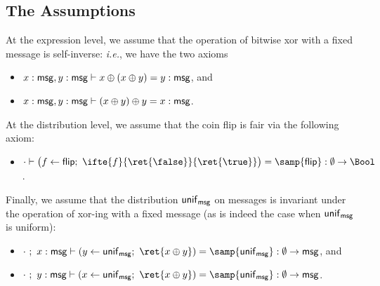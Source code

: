 \subsection{The Assumptions}
At the expression level, we assume that the operation of bitwise xor with a fixed message is self-inverse: \emph{i.e.}, we have the two axioms
\begin{itemize}
\item $x : \mathsf{msg}, y : \mathsf{msg} \vdash x \oplus (x \oplus y) = y : \mathsf{msg}$, and
\item $x : \mathsf{msg}, y : \mathsf{msg} \vdash (x \oplus y) \oplus y = x : \mathsf{msg}$.
\end{itemize}
At the distribution level, we assume that the coin flip is fair via the following axiom:
\begin{itemize}
\item $\cdot \vdash \big(f \leftarrow \flip; \ \ifte{f}{\ret{\false}}{\ret{\true}}\big) = \samp{\flip} : \emptyset \to \Bool$.
\end{itemize}
Finally, we assume that the distribution $\mathsf{unif}_{\mathsf{msg}}$ on messages is invariant under the operation of xor-ing with a fixed message (as is indeed the case when $\mathsf{unif}_{\mathsf{msg}}$ is uniform):
\begin{itemize}
\item $\cdot \ ; \ x : \msg \vdash (y \leftarrow \unif_\msg; \ \ret{x \oplus y}) = \samp{\unif_\msg} : \emptyset \to \msg$, and
\item $\cdot \ ; \ y : \msg \vdash (x \leftarrow \unif_\msg; \ \ret{x \oplus y}) = \samp{\unif_\msg} : \emptyset \to \msg$.
\end{itemize}

